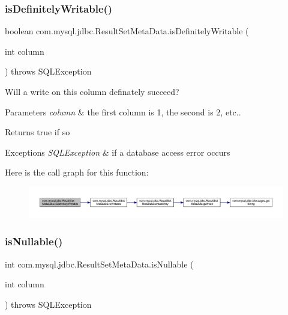 \subsubsection{\texorpdfstring{is\+Definitely\+Writable()}{isDefinitelyWritable()}}
{\footnotesize\ttfamily boolean com.\+mysql.\+jdbc.\+Result\+Set\+Meta\+Data.\+is\+Definitely\+Writable (\begin{DoxyParamCaption}\item[{int}]{column }\end{DoxyParamCaption}) throws S\+Q\+L\+Exception}

Will a write on this column definately succeed?


\begin{DoxyParams}{Parameters}
{\em column} & the first column is 1, the second is 2, etc..\\
\hline
\end{DoxyParams}
\begin{DoxyReturn}{Returns}
true if so
\end{DoxyReturn}

\begin{DoxyExceptions}{Exceptions}
{\em S\+Q\+L\+Exception} & if a database access error occurs \\
\hline
\end{DoxyExceptions}
Here is the call graph for this function\+:
\nopagebreak
\begin{figure}[H]
\begin{center}
\leavevmode
\includegraphics[width=350pt]{classcom_1_1mysql_1_1jdbc_1_1_result_set_meta_data_a5b118f6ee07908b8ba7983948bea557f_cgraph}
\end{center}
\end{figure}
\mbox{\label{classcom_1_1mysql_1_1jdbc_1_1_result_set_meta_data_a40067f0bf2d16b2809974ebac6445d23}} 
\subsubsection{\texorpdfstring{is\+Nullable()}{isNullable()}}
{\footnotesize\ttfamily int com.\+mysql.\+jdbc.\+Result\+Set\+Meta\+Data.\+is\+Nullable (\begin{DoxyParamCaption}\item[{int}]{column }\end{DoxyParamCaption}) throws S\+Q\+L\+Exception}

